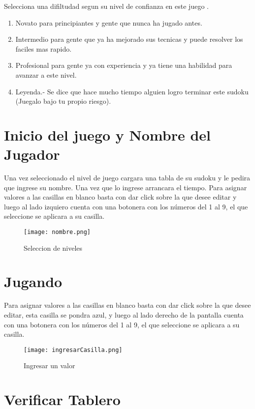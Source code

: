 \documentclass[11pt,fleqn]{book} %
\begin{document}
Selecciona una difiltudad segun su nivel de confianza en este juego .
\begin{enumerate}
\item Novato para principiantes y gente que nunca ha jugado antes.
\item Intermedio para gente que ya ha mejorado sus tecnicas y puede resolver los faciles mas rapido.
\item Profesional para gente ya con experiencia y ya tiene una habilidad para avanzar a este nivel.
\item Leyenda.- Se dice que hace mucho tiempo alguien logro terminar este sudoku (Juegalo bajo tu propio riesgo).
\end{enumerate}



\section{Inicio del juego y Nombre del Jugador}

Una vez seleccionado el nivel de juego cargara una tabla de su sudoku y le pedira que ingrese su nombre. Una vez que lo ingrese arrancara el tiempo.
Para asignar valores a las casillas en blanco basta con dar click sobre la que desee editar y luego al lado izquiero cuenta con una botonera con los números del 1 al 9, el que seleccione se aplicara a su casilla.

\begin{figure}[H]
\centering\texttt{[image: nombre.png]}
\caption{Seleccion de niveles}
\end{figure}

\section{Jugando}

Para asignar valores a las casillas en blanco basta con dar click sobre la que desee editar, esta casilla se pondra azul, y luego al lado derecho de la pantalla cuenta con una botonera con los números del 1 al 9, el que seleccione se aplicara a su casilla.

\begin{figure}[H]
\centering\texttt{[image: ingresarCasilla.png]}
\caption{Ingresar un valor}
\end{figure}

\section{Verificar Tablero}
\end{document}
